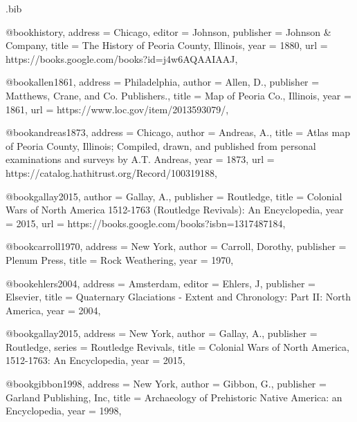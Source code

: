 \def\affilone{Cultural Field Technician, Cardno JFNew}

\def\affiloneauthor{*}%
\def\affiltwoauthor{†}%

\begin{filecontents}{\IJSRAidentifier.bib}

	@book{history,
		address = {Chicago},
		editor = {Johnson},
		publisher = {Johnson \& Company},
		title = {The History of Peoria County, Illinois},
		year = {1880},
		url = {https://books.google.com/books?id=j4w6AQAAIAAJ},
	}

	@book{allen1861,
		address = {Philadelphia},
		author = {Allen, D.},
		publisher = {Matthews, Crane, and Co. Publishers.},
		title = {Map of Peoria Co., Illinois},
		year = {1861},
		url = {https://www.loc.gov/item/2013593079/},
	}

	@book{andreas1873,
		address = {Chicago},
		author = {Andreas, A.},
		title = {Atlas map of Peoria County, Illinois; Compiled, drawn, and published from personal examinations and surveys by A.T. Andreas},
		year = {1873},
		url = {https://catalog.hathitrust.org/Record/100319188},
	}

	@book{gallay2015,
		author = {Gallay, A.},
		publisher = {Routledge},
		title = {Colonial Wars of North America 1512-1763 (Routledge Revivals): An Encyclopedia},
		year = {2015},
		url = {https://books.google.com/books?isbn=1317487184},
	}

	@book{carroll1970,
		address = {New York},
		author = {Carroll, Dorothy},
		publisher = {Plenum Press},
		title = {Rock Weathering},
		year = {1970},
	}

	@book{ehlers2004,
		address = {Amsterdam},
		editor = {Ehlers, J},
		publisher = {Elsevier},
		title = {Quaternary Glaciations - Extent and Chronology: Part II: North America},
		year = {2004},
	}

	@book{gallay2015,
		address = {New York},
		author = {Gallay, A.},
		publisher = {Routledge},
		series = {Routledge Revivals},
		title = {Colonial Wars of North America, 1512-1763: An Encyclopedia},
		year = {2015},
	}

	@book{gibbon1998,
		address = {New York},
		author = {Gibbon, G.},
		publisher = {Garland Publishing, Inc},
		title = {Archaeology of Prehistoric Native America: an Encyclopedia},
		year = {1998},
	}




\end{filecontents}
